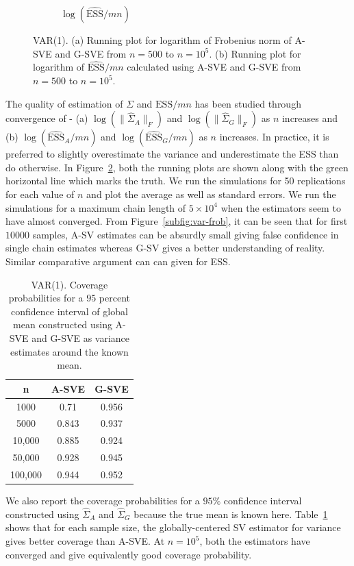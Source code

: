 \documentclass[11pt]{article}
\theoremstyle{remark}
\begin{document}
\begin{figure}[h]
\begin{subfigure}{0.4\textwidth}
      \caption{$\log(\widehat{\textrm{ESS}}/mn)$}
      \label{subfig:var-ess}
    \end{subfigure}
    \caption{VAR(1). (a) Running plot for logarithm of Frobenius norm of A-SVE and G-SVE from $n = 500$ to $n = 10^5$. (b) Running plot for logarithm of $\widehat{\textrm{ESS}}/mn$ calculated using A-SVE and G-SVE from $n=500$ to $n=10^5$.}
    \label{fig:var-frob_n_ess}
\end{figure}

The quality of estimation of $\Sigma$ and $\text{ESS}/mn$ has been studied through convergence of - (a) $\log(\|\hat{\Sigma}_A\|_F)$ and $\log(\|\hat{\Sigma}_G\|_F)$ as $n$ increases and (b) $\log(\widehat{\textrm{ESS}}_A/mn)$ and $\log(\widehat{\textrm{ESS}}_G/mn)$ as $n$ increases. In practice, it is preferred to slightly overestimate the variance and underestimate the ESS than do otherwise. In Figure~\ref{fig:var-frob_n_ess}, both the running plots are shown along with the green horizontal line which marks the truth. We run the simulations for 50 replications for each value of $n$ and plot the average as well as standard errors. We run the simulations for a maximum chain length of $5 \times 10^4$ when the estimators seem to have almost converged. From Figure~\ref{subfig:var-frob}, it can be seen that for first $10000$ samples, A-SV estimates can be absurdly small giving false confidence in single chain estimates whereas G-SV gives a better understanding of reality. Similar comparative argument can can given for ESS.


\begin{table}[h]
    \centering
    \begin{tabular}{|c|c|c|}
    \hline
    n & A-SVE & G-SVE\\
    \hline
    1000 & 0.71 & 0.956\\
    5000 & 0.843 & 0.937\\
    10,000 & 0.885 & 0.924\\
    50,000 & 0.928 & 0.945\\
    100,000 & 0.944 & 0.952\\
    \hline
    \end{tabular}
    \caption{VAR(1). Coverage probabilities for a $95$ percent confidence interval of global mean constructed using A-SVE and G-SVE as variance estimates around the known mean.}
    \label{tab:var-coverage}
\end{table}


We also report the coverage probabilities for a $95\%$ confidence interval constructed using $\hat{\Sigma}_A$ and $\hat{\Sigma}_G$ because the true mean is known here. Table~\ref{tab:var-coverage} shows that for each sample size, the globally-centered SV estimator for variance gives better coverage than A-SVE. At $n=10^5$, both the estimators have converged and give equivalently good coverage probability.
\end{document}
